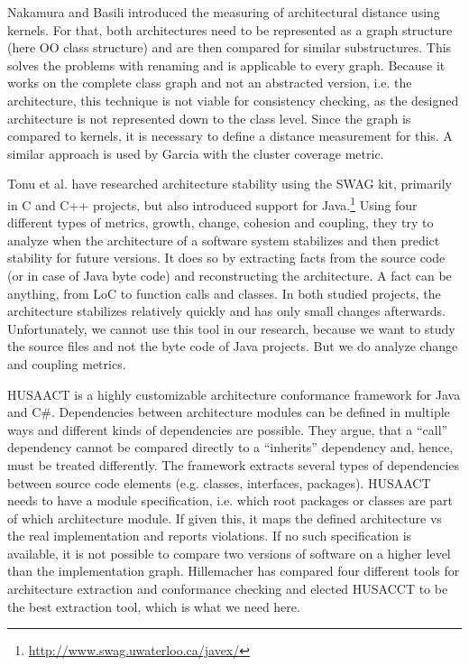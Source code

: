 \documentclass[sigplan, anonymous, review]{acmart}
\begin{document}
Nakamura and Basili \cite{StructDist} introduced the measuring of architectural distance using kernels. For that, both architectures need to be represented as a graph structure (here OO class structure) and are then compared for similar substructures. This solves the problems with renaming and is applicable to every graph. 
Because it works on the complete class graph and not an abstracted version, i.e. the architecture, this technique is not viable for consistency checking, as the designed architecture is not represented down to the class level. 
Since the graph is compared to kernels, it is necessary to define a distance measurement for this. A similar approach is used by Garcia \cite{arcade-thesis} with the cluster coverage metric.

Tonu et al. \cite{Swag} have researched architecture stability using the SWAG kit, primarily in C and C++ projects, but also introduced support for Java.\footnote{\url{http://www.swag.uwaterloo.ca/javex/}} Using four different types of metrics, growth, change, cohesion and coupling, they try to analyze when the architecture of a software system stabilizes and then predict stability for future versions. It does so by extracting facts from the source code (or in case of Java byte code) and reconstructing the architecture. A fact can be anything, from LoC to function calls and classes. 
In both studied projects, the architecture stabilizes relatively quickly and has only small changes afterwards. Unfortunately, we cannot use this tool in our research, because we want to study the source files and not the byte code of Java projects. But we do analyze change and coupling metrics.

HUSAACT \cite{Husacct1,Husacct2} is a highly customizable architecture conformance framework for Java and C\#. Dependencies between architecture modules can be defined in multiple ways and different kinds of dependencies are possible. They argue, that a ``call'' dependency cannot be compared directly to a ``inherits'' dependency and, hence, must be treated differently. 
The framework extracts several types of dependencies between source code elements (e.g. classes, interfaces, packages). HUSAACT needs to have a module specification, i.e. which root packages or classes are part of which architecture module. If given this, it maps the defined architecture vs the real implementation and reports violations.
If no such specification is available, it is not possible to compare two versions of software on a higher level than the implementation graph. 
Hillemacher \cite{MScSteffen} has compared four different tools for architecture extraction and conformance checking and elected HUSACCT to be the best extraction tool, which is what we need here.
\end{document}
